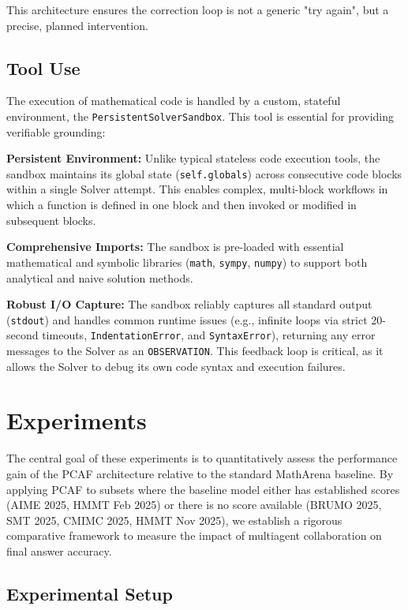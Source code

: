 \documentclass{article}
\begin{document}
This architecture ensures the correction loop is not a generic "try
again", but a precise, planned intervention.

\subsection{Tool Use}

The execution of mathematical code is handled by a custom, stateful
environment, the \texttt{PersistentSolverSandbox}. This tool is essential
for providing verifiable grounding:

\textbf{Persistent Environment:}
  Unlike typical stateless code execution tools, the sandbox maintains
  its global state (\texttt{self.globals}) across consecutive code blocks
  within a single Solver attempt. This enables complex, multi-block
  workflows in which a function is defined in one block and then invoked
  or modified in subsequent blocks.


\textbf{Comprehensive Imports:}
  The sandbox is pre-loaded with essential mathematical and symbolic
  libraries (\texttt{math}, \texttt{sympy}, \texttt{numpy}) to support both
  analytical and naive solution methods.


\textbf{Robust I/O Capture:}
  The sandbox reliably captures all standard output (\texttt{stdout}) and
  handles common runtime issues (e.g., infinite loops via strict 20-second timeouts,
  \texttt{IndentationError}, and \texttt{SyntaxError}), returning any error
  messages to the Solver as an \texttt{OBSERVATION}. This feedback loop is critical, as it allows the Solver to debug its own code syntax and execution failures.
\section{Experiments}
\label{sec:experiments}

The central goal of these experiments is to quantitatively assess the performance gain of the PCAF architecture 
relative to the standard MathArena baseline. By applying PCAF to subsets where the baseline model 
either has established scores (AIME 2025, HMMT Feb 2025) or there is no score available (BRUMO 2025, SMT 2025, CMIMC 2025, HMMT Nov 2025), 
we establish a rigorous comparative framework to measure the impact of multiagent collaboration on final answer accuracy.

\subsection{Experimental Setup}
\end{document}
